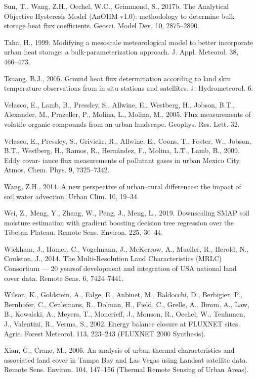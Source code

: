\documentclass[3p,times]{elsarticle}
\begin{document}
Sun, T., Wang, Z.H., Oechel, W.C., Grimmond, S., 2017b. The Analytical Objective Hysteresis Model (AnOHM v1.0): methodology to determine bulk storage heat flux coefficients. Geosci. Model Dev. 10, 2875–2890.

Taha, H., 1999. Modifying a mesoscale meteorological model to better incorporate urban heat storage: a bulk-parameterization approach. J. Appl. Meteorol. 38, 466–473.

Tsuang, B.J., 2005. Ground heat flux determination according to land skin temperature observations from in situ stations and satellites. J. Hydrometeorol. 6.

Velasco, E., Lamb, B., Pressley, S., Allwine, E., Westberg, H., Jobson, B.T., Alexander, M., Prazeller, P., Molina, L., Molina, M., 2005. Flux measurements of volatile organic compounds from an urban landscape. Geophys. Res. Lett. 32.

Velasco, E., Pressley, S., Grivicke, R., Allwine, E., Coons, T., Foster, W., Jobson, B.T., Westberg, H., Ramos, R., Hernández, F., Molina, L.T., Lamb, B., 2009. Eddy covar- iance flux measurements of pollutant gases in urban Mexico City. Atmos. Chem. Phys. 9, 7325–7342.

Wang, Z.H., 2014. A new perspective of urban–rural differences: the impact of soil water advection. Urban Clim. 10, 19–34.

Wei, Z., Meng, Y., Zhang, W., Peng, J., Meng, L., 2019. Downscaling SMAP soil moisture estimation with gradient boosting decision tree regression over the Tibetan Plateau. Remote Sens. Environ. 225, 30–44.

Wickham, J., Homer, C., Vogelmann, J., McKerrow, A., Mueller, R., Herold, N., Coulston, J., 2014. The Multi-Resolution Land Characteristics (MRLC) Consortium — 20 yearsof development and integration of USA national land cover data. Remote Sens. 6, 7424–7441.

Wilson, K., Goldstein, A., Falge, E., Aubinet, M., Baldocchi, D., Berbigier, P., Bernhofer, C., Ceulemans, R., Dolman, H., Field, C., Grelle, A., Ibrom, A., Law, B., Kowalski, A., Meyers, T., Moncrieff, J., Monson, R., Oechel, W., Tenhunen, J., Valentini, R., Verma, S., 2002. Energy balance closure at FLUXNET sites. Agric. Forest Meteorol. 113, 223–243 (FLUXNET 2000 Synthesis).

Xian, G., Crane, M., 2006. An analysis of urban thermal characteristics and associated land cover in Tampa Bay and Las Vegas using Landsat satellite data. Remote Sens. Environ. 104, 147–156 (Thermal Remote Sensing of Urban Areas).
\end{document}
